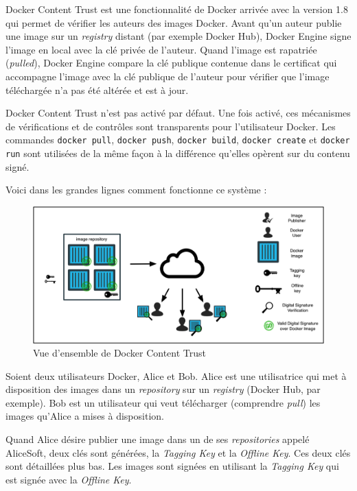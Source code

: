 \documentclass[11pt,a4paper,oneside]{report}
\newcommand{\code}[1]{\texttt{#1}}
\begin{document}
Docker Content Trust\cite{blog_docker_content_trust}\cite{mouat_2005} est une fonctionnalité de Docker arrivée avec la version 1.8 qui permet de vérifier les auteurs des images Docker. Avant qu'un auteur publie une image sur un \textit{registry} distant (par exemple Docker Hub), Docker Engine signe l'image en local avec la clé privée de l'auteur. Quand l'image est rapatriée (\textit{pulled}), Docker Engine compare la clé publique contenue dans le certificat qui accompagne l'image avec la clé publique de l'auteur pour vérifier que l'image téléchargée n'a pas été altérée et est à jour.

Docker Content Trust n'est pas activé par défaut. Une fois activé, ces mécanismes de vérifications et de contrôles sont transparents pour l'utilisateur Docker. Les commandes \code{docker pull}, \code{docker push}, \code{docker build}, \code{docker create} et \code{docker run} sont utilisées de la même façon à la différence qu'elles opèrent sur du contenu signé.

Voici dans les grandes lignes comment fonctionne ce système :

\begin{figure}[H]
\centering
\includegraphics[scale=1]{img/dct1.png}
\caption{Vue d'ensemble de Docker Content Trust}
\end{figure}

Soient deux utilisateurs Docker, Alice et Bob. Alice est une utilisatrice qui met à disposition des images dans un \textit{repository} sur un \textit{registry} (Docker Hub, par exemple). Bob est un utilisateur qui veut télécharger (comprendre \textit{pull}) les images qu'Alice a mises à disposition.

Quand Alice désire publier une image dans un de ses \textit{repositories} appelé AliceSoft, deux clés sont générées, la \textit{Tagging Key} et la \textit{Offline Key}. Ces deux clés sont détaillées plus bas. Les images sont signées en utilisant la \textit{Tagging Key} qui est signée avec la \textit{Offline Key}.
\end{document}
